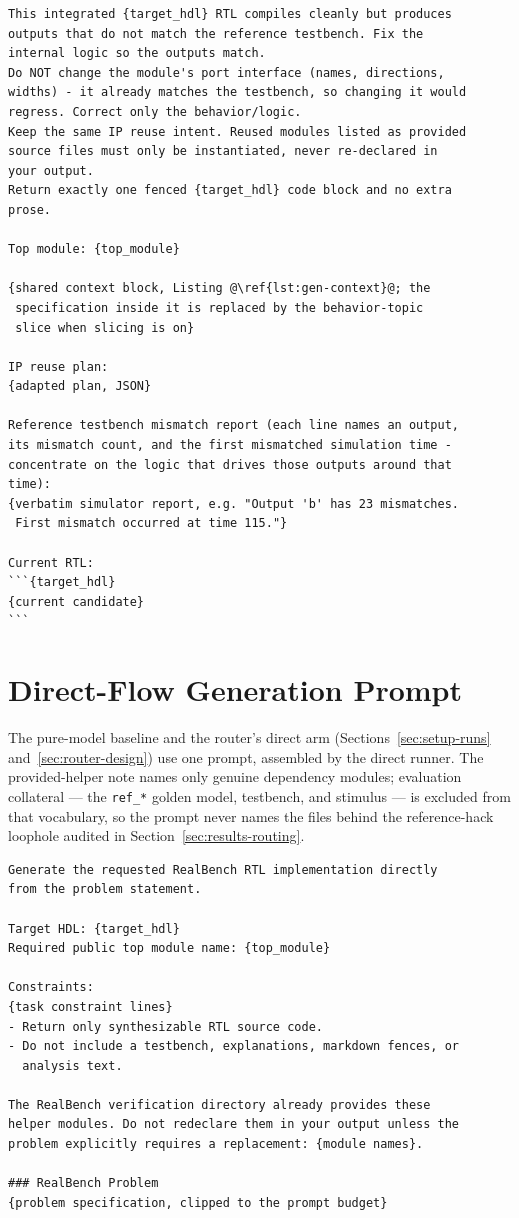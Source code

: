 \begin{lstlisting}[language={},escapechar=@,caption={Functional repair
prompt.},label={lst:func-prompt}]
This integrated {target_hdl} RTL compiles cleanly but produces
outputs that do not match the reference testbench. Fix the
internal logic so the outputs match.
Do NOT change the module's port interface (names, directions,
widths) - it already matches the testbench, so changing it would
regress. Correct only the behavior/logic.
Keep the same IP reuse intent. Reused modules listed as provided
source files must only be instantiated, never re-declared in
your output.
Return exactly one fenced {target_hdl} code block and no extra
prose.

Top module: {top_module}

{shared context block, Listing @\ref{lst:gen-context}@; the
 specification inside it is replaced by the behavior-topic
 slice when slicing is on}

IP reuse plan:
{adapted plan, JSON}

Reference testbench mismatch report (each line names an output,
its mismatch count, and the first mismatched simulation time -
concentrate on the logic that drives those outputs around that
time):
{verbatim simulator report, e.g. "Output 'b' has 23 mismatches.
 First mismatch occurred at time 115."}

Current RTL:
```{target_hdl}
{current candidate}
```
\end{lstlisting}

\section{Direct-Flow Generation Prompt}
\label{app:direct}

The pure-model baseline and the router's direct arm
(Sections~\ref{sec:setup-runs} and~\ref{sec:router-design}) use one
prompt, assembled by the direct runner. The provided-helper note names
only genuine dependency modules; evaluation collateral --- the
\texttt{ref\_*} golden model, testbench, and stimulus --- is excluded
from that vocabulary, so the prompt never names the files behind the
reference-hack loophole audited in
Section~\ref{sec:results-routing}.

\begin{lstlisting}[language={},caption={Direct-flow generation
prompt.},label={lst:direct-prompt}]
Generate the requested RealBench RTL implementation directly
from the problem statement.

Target HDL: {target_hdl}
Required public top module name: {top_module}

Constraints:
{task constraint lines}
- Return only synthesizable RTL source code.
- Do not include a testbench, explanations, markdown fences, or
  analysis text.

The RealBench verification directory already provides these
helper modules. Do not redeclare them in your output unless the
problem explicitly requires a replacement: {module names}.

### RealBench Problem
{problem specification, clipped to the prompt budget}
\end{lstlisting}

